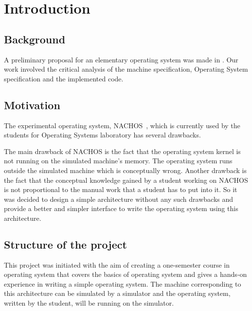 \pagestyle{plain}
\chapter{Introduction}

\section{Background}
\label{background}
A preliminary proposal for an elementary operating system was made in \cite{group1,group2}.
Our work involved the critical analysis of the machine specification, Operating System specification and the implemented code.

\section{Motivation}
\label{motivation}
The experimental operating system, NACHOS~\cite{nachos}, which is currently used by the students for Operating Systems laboratory has several drawbacks.

The main drawback of NACHOS is the fact that the operating system kernel is not running on the simulated machine's memory. The operating system runs outside the simulated machine which is conceptually wrong.
Another drawback is the fact that the conceptual knowledge gained by a student working on NACHOS is not proportional to the manual work that a student has to put into it.
So it was decided to design a simple architecture without any such drawbacks and provide a better and simpler interface to write the operating system using this architecture.

\section{Structure of the project}
This project was initiated with the aim of creating a one-semester course in operating system that covers the basics of operating system and gives a hands-on experience in writing a simple operating system.	The machine corresponding to this architecture can be simulated by a simulator and the operating system, written by the student, will be running on the simulator. 

